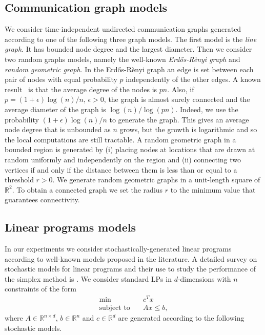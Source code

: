 \documentclass[onecolumn,journal,letterpaper]{IEEEtran}
\newcommand{\real}{{\mathbb{R}}}
\newcommand{\subject}{\text{subject to}}
\begin{document}
\subsection{Communication graph models}
We consider time-independent undirected communication graphs generated
according to one of the following three graph models. The first model is
the \emph{line graph}. It has bounded node degree and the largest
diameter. Then we consider two random graphs models, namely the well-known
\emph{Erd\H{o}s-R\`enyi graph} and \emph{random geometric graph}. In the
Erd\H{o}s-R\`enyi graph an edge is set between each pair of nodes with
equal probability $p$ independently of the other edges. A known
result~\cite{RA-ALB:02} is that the average degree of the nodes is $p
n$. Also, if $p = (1 + \epsilon) \log(n) / n$, $\epsilon > 0$, the graph is
almost surely connected and the average diameter of the graph is $\log(n) /
\log(pn)$. Indeed, we use the probability $(1 + \epsilon) \log(n) / n$ to
generate the graph. This gives an average node degree that is unbounded as
$n$ grows, but the growth is logarithmic and so the local computations are
still tractable. A random geometric graph in a bounded region is generated
by (i) placing nodes at locations that are drawn at random uniformly and
independently on the region and (ii) connecting two vertices if and only if
the distance between them is less than or equal to a threshold $r>0$. We
generate random geometric graphs in a unit-length square of $\real^2$.  To
obtain a connected graph we set the radius $r$ to the minimum value that
guarantees connectivity.


\subsection{Linear programs models}
In our experiments we consider stochastically-generated linear programs
according to well-known models proposed in the literature. A detailed
survey on stochastic models for linear programs and their use to study the
performance of the simplex method is \cite{RS:87}.  We consider standard
LPs in $d$-dimensions with $n$ constraints of the form
\begin{equation*}
  \begin{split}
    \min  &\quad c^T x\\
    \subject &\quad A x \leq b,
  \end{split}
\end{equation*}
where $A\in\real^{n\times d}$, $b\in\real^n$ and $c\in\real^d$ are
generated according to the following stochastic models.
\end{document}
